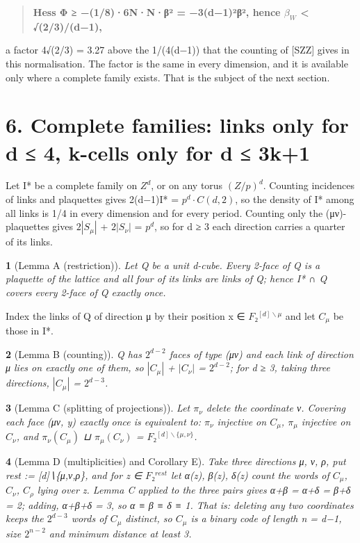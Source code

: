 \documentclass[11pt,a4paper]{article}
\theoremstyle{named}
\newtheorem*{namedthm}{}
\begin{document}
\begin{quote}
\textbf{Hess Φ ≥ −(1/8)·6N·N·β² = −3(d−1)²β²,  hence $β_W$ \textless{} √(2/3)/(d−1),}
\end{quote}
a factor 4√(2/3) = 3.27 above the 1/(4(d−1)) that the counting of [SZZ] gives in this normalisation. The factor is the same in every dimension, and it is available only where a complete family exists. That is the subject of the next section.

\section*{6. Complete families: links only for d ≤ 4, k-cells only for d ≤ 3k+1}
Let I* be a complete family on $Z^d$, or on any torus $(Z/p)^d$. Counting incidences of links and plaquettes gives 2(d−1)\textbar{}I*\textbar{} = $p^d·C(d,2)$, so the density of I* among all links is 1/4 in every dimension and for every period. Counting only the (μν)-plaquettes gives $2|S_{μ}|$ + $2|S_{ν}|$ = $p^d$, so for d ≥ 3 each direction carries a quarter of its links.

\begin{namedthm}[Lemma A (restriction)]
Let Q be a unit d-cube. Every 2-face of Q is a plaquette of the lattice and all four of its links are links of Q; hence I* ∩ Q covers every 2-face of Q exactly once.
\end{namedthm}

Index the links of Q of direction μ by their position x ∈ $F₂^{[d]∖μ}$ and let $C_{μ}$ be those in I*.

\begin{namedthm}[Lemma B (counting)]
Q has $2^{d−2}$ faces of type (μν) and each link of direction μ lies on exactly one of them, so $|C_{μ}|$ + $|C_{ν}|$ = $2^{d−2}$; for d ≥ 3, taking three directions, $|C_{μ}|$ = $2^{d−3}$.
\end{namedthm}

\begin{namedthm}[Lemma C (splitting of projections)]
Let $π_{ν}$ delete the coordinate ν. Covering each face (μν, y) exactly once is equivalent to: $π_{ν}$ injective on $C_{μ}$, $π_{μ}$ injective on $C_{ν}$, and $π_{ν}(C_{μ})$ ⊔ $π_{μ}(C_{ν})$ = $F₂^{[d]∖\{μ,ν\}}$.
\end{namedthm}

\begin{namedthm}[Lemma D (multiplicities) and Corollary E]
Take three directions μ, ν, ρ, put rest := [d]∖\{μ,ν,ρ\}, and for z ∈ $F₂^{rest}$ let α(z), β(z), δ(z) count the words of $C_{μ}$, $C_{ν}$, $C_{ρ}$ lying over z. Lemma C applied to the three pairs gives α+β = α+δ = β+δ = 2; adding, α+β+δ = 3, so α ≡ β ≡ δ ≡ 1. That is: deleting any two coordinates keeps the $2^{d−3}$ words of $C_{μ}$ distinct, so $C_{μ}$ is a binary code of length n = d−1, size $2^{n−2}$ and minimum distance at least 3.
\end{namedthm}
\end{document}
